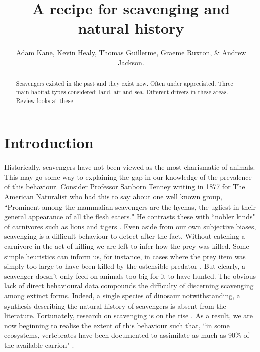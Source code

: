 \documentclass[a4paper,12pt]{article}
\title{A recipe for scavenging and natural history}
\author{Adam Kane, Kevin Healy, Thomas Guillerme, Graeme Ruxton, \& Andrew Jackson.}
\begin{document}
\maketitle


\begin{abstract}
 Scavengers existed in the past and they exist now. 
 Often under appreciated. 
 Three main habitat types considered: land, air and sea. 
 Different drivers in these areas. 
 Review looks at these 
\end{abstract}

\newpage


\section*{Introduction}
Historically, scavengers have not been viewed as the most charismatic of animals.
This may go some way to explaining the gap in our knowledge of the prevalence of this behaviour.
Consider Professor Sanborn Tenney writing in 1877 for The American Naturalist who had this to say about one well known group, ``Prominent among the mammalian scavengers are the hyenas, the ugliest in their general appearance of all the flesh eaters."
He contrasts these with ``nobler kinds" of carnivores such as lions and tigers \citep{tenney1877few}.
Even aside from our own subjective biases, scavenging is a difficult behaviour to detect after the fact.
Without catching a carnivore in the act of killing we are left to infer how the prey was killed.
Some simple heuristics can inform us, for instance, in cases where the prey item was simply too large to have been killed by the ostensible predator \citep{pobiner2008paleoecological}.
But clearly, a scavenger doesn’t only feed on animals too big for it to have hunted.
The obvious lack of direct behavioural data compounds the difficulty of discerning scavenging among extinct forms.
Indeed, a single species of dinosaur notwithstanding, a synthesis describing the natural history of scavengers is absent from the literature.
Fortunately, research on scavenging is on the rise \citep{manga2006vulture}.
As a result, we are now beginning to realise the extent of this behaviour such that, ``in some ecosystems, vertebrates have been documented to assimilate as much as 90\% of the available carrion" \citep{beasley2015vertebrates}.
\end{document}
